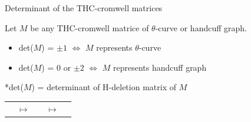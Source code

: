 \begin{frame}{Determinant of the THC-cromwell matrices}
	\begin{thm}
		Let $M$ be any THC-cromwell matrice of $\theta$-curve or handcuff graph. \\
		\begin{itemize}
			\item det($M$) = $\pm1$ $\iff$ $M$ represents $\theta$-curve
			\item det($M$) = $0$ or $\pm2$ $\iff$ $M$ represents handcuff graph
		\end{itemize}
		*det($M$) = determinant of H-deletion matrix of $M$
	\end{thm}
	\mypf
	\begin{tabu}{X[5c]X[c]X[5c]X[c]X[5c]}
			 &
			$\longmapsto$ &
			 &
			$\longmapsto$ &
	\end{tabu}
\end{frame}

